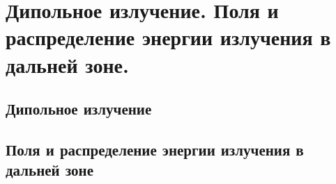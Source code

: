 \chapter{Дипольное излучение. Поля и распределение энергии излучения в 
дальней зоне.}

\section{Дипольное излучение}
\section{Поля и распределение энергии излучения в дальней зоне}
